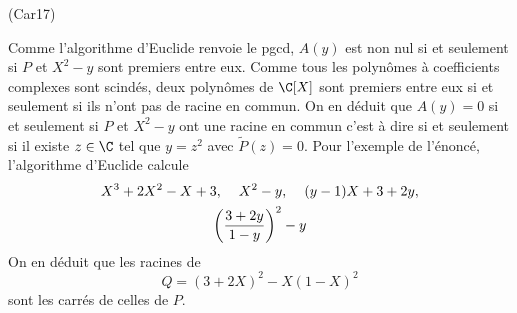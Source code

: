 \begin{tiny}(Car17)\end{tiny} Comme l'algorithme d'Euclide renvoie le pgcd, $A(y)$ est non nul si et seulement si $P$ et $X^2-y$ sont premiers entre eux. Comme tous les polynômes à coefficients complexes sont scindés, deux polynômes de $\C[X]$ sont premiers entre eux si et seulement si ils n'ont pas de racine en commun. On en déduit que $A(y)=0$ si et seulement si $P$ et $X^2-y$ ont une racine en commun c'est à dire si et seulement si il existe $z\in \C$ tel que $y=z^2$ avec $\widetilde{P}(z)=0$.\newline
Pour l'exemple de l'énoncé, l'algorithme d'Euclide calcule
\begin{multline*}
 X^3+2X^2-X+3,\hspace{0.4cm} X^2 -y, \hspace{0.4cm} (y-1)X+3+2y, \\
\left( \frac{3+2y}{1-y}\right)^2-y 
\end{multline*}
On en déduit que les racines de 
\begin{displaymath}
 Q = (3+2X)^2 -X(1-X)^2
\end{displaymath}
sont les carrés de celles de $P$. 